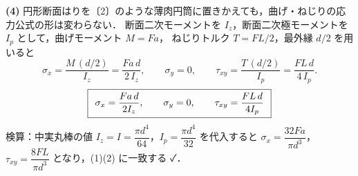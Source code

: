 \documentclass[11pt,a4paper]{article}
\begin{document}
\medskip
\noindent\textbf{(4)}\quad
円形断面はりを〔2〕のような薄肉円筒に置きかえても，曲げ・ねじりの応力公式の形は変わらない．
断面二次モーメントを $I_z$，断面二次極モーメントを $I_p$ として，曲げモーメント $M=Fa$，
ねじりトルク $T=FL/2$，最外縁 $d/2$ を用いると
\[
  \sigma_x=\frac{M\,(d/2)}{I_z}=\frac{F a\,d}{2\,I_z},\qquad
  \sigma_y=0,\qquad
  \tau_{xy}=\frac{T\,(d/2)}{I_p}=\frac{F L\,d}{4\,I_p}.
\]
\[
  \boxed{\,\;\sigma_x=\frac{F a\,d}{2 I_z},\qquad \sigma_y=0,\qquad \tau_{xy}=\frac{F L\,d}{4 I_p}\;\,}
\]
検算：中実丸棒の値 $I_z=I=\dfrac{\pi d^4}{64}$，$I_p=\dfrac{\pi d^4}{32}$ を代入すると
$\sigma_x=\dfrac{32Fa}{\pi d^3}$，$\tau_{xy}=\dfrac{8FL}{\pi d^3}$ となり，(1)(2) に一致する ✓．
\end{document}
